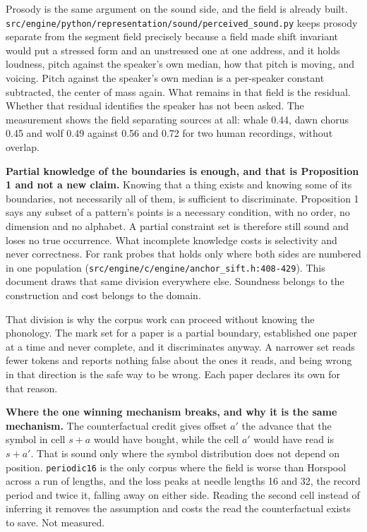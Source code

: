 Prosody is the same argument on the sound side, and the field is already built. \texttt{src/\allowbreak{}engine/\allowbreak{}python/\allowbreak{}representation/\allowbreak{}sound/\allowbreak{}perceived\_\allowbreak{}sound.\allowbreak{}py} keeps prosody separate from the segment field precisely because a field made shift invariant would put a stressed form and an unstressed one at one address, and it holds loudness, pitch against the speaker's own median, how that pitch is moving, and voicing. Pitch against the speaker's own median is a per-speaker constant subtracted, the center of mass again. What remains in that field is the residual. Whether that residual identifies the speaker has not been asked. The measurement shows the field separating sources at all: whale 0.44, dawn chorus 0.45 and wolf 0.49 against 0.56 and 0.72 for two human recordings, without overlap.

\textbf{Partial knowledge of the boundaries is enough, and that is Proposition 1 and not a new claim.} Knowing that a thing exists and knowing some of its boundaries, not necessarily all of them, is sufficient to discriminate. Proposition 1 says any subset of a pattern's points is a necessary condition, with no order, no dimension and no alphabet. A partial constraint set is therefore still sound and loses no true occurrence. What incomplete knowledge costs is selectivity and never correctness. For rank probes that holds only where both sides are numbered in one population (\texttt{src/\allowbreak{}engine/\allowbreak{}c/\allowbreak{}engine/\allowbreak{}anchor\_sift.h:408-429}). This document draws that same division everywhere else. Soundness belongs to the construction and cost belongs to the domain.

That division is why the corpus work can proceed without knowing the phonology. The mark set for a paper is a partial boundary, established one paper at a time and never complete, and it discriminates anyway. A narrower set reads fewer tokens and reports nothing false about the ones it reads, and being wrong in that direction is the safe way to be wrong. Each paper declares its own for that reason.

\textbf{Where the one winning mechanism breaks, and why it is the same mechanism.} The counterfactual credit gives offset \(a'\) the advance that the symbol in cell \(s+a\) would have bought, while the cell \(a'\) would have read is \(s+a'\). That is sound only where the symbol distribution does not depend on position. \texttt{periodic16} is the only corpus where the field is worse than Horspool across a run of lengths, and the loss peaks at needle lengths 16 and 32, the record period and twice it, falling away on either side. Reading the second cell instead of inferring it removes the assumption and costs the read the counterfactual exists to save. Not measured.

